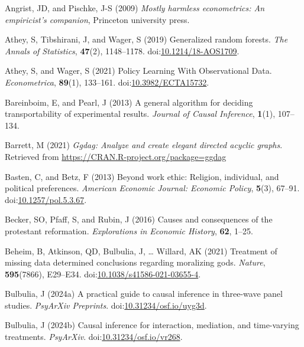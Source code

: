\documentclass[
  single column]{article}
\newlength{\cslhangindent}
\newenvironment{CSLReferences}[2] %
 {\begin{list}{}{%
  \setlength{\itemindent}{0pt}
  \setlength{\leftmargin}{0pt}
  \setlength{\parsep}{0pt}
  \ifodd #1
   \setlength{\leftmargin}{\cslhangindent}
   \setlength{\itemindent}{-1\cslhangindent}
  \fi
  \setlength{\itemsep}{#2\baselineskip}}}
 {\end{list}}
\begin{document}
\begin{CSLReferences}{1}{0}
Angrist, JD, and Pischke, J-S (2009) \emph{Mostly harmless econometrics:
An empiricist's companion}, Princeton university press.

Athey, S, Tibshirani, J, and Wager, S (2019) Generalized random forests.
\emph{The Annals of Statistics}, \textbf{47}(2), 1148--1178.
doi:\href{https://doi.org/10.1214/18-AOS1709}{10.1214/18-AOS1709}.

Athey, S, and Wager, S (2021) Policy Learning With Observational Data.
\emph{Econometrica}, \textbf{89}(1), 133--161.
doi:\href{https://doi.org/10.3982/ECTA15732}{10.3982/ECTA15732}.

Bareinboim, E, and Pearl, J (2013) A general algorithm for deciding
transportability of experimental results. \emph{Journal of Causal
Inference}, \textbf{1}(1), 107--134.

Barrett, M (2021) \emph{Ggdag: Analyze and create elegant directed
acyclic graphs}. Retrieved from
\url{https://CRAN.R-project.org/package=ggdag}

Basten, C, and Betz, F (2013) Beyond work ethic: Religion, individual,
and political preferences. \emph{American Economic Journal: Economic
Policy}, \textbf{5}(3), 67--91.
doi:\href{https://doi.org/10.1257/pol.5.3.67}{10.1257/pol.5.3.67}.

Becker, SO, Pfaff, S, and Rubin, J (2016) Causes and consequences of the
protestant reformation. \emph{Explorations in Economic History},
\textbf{62}, 1--25.

Beheim, B, Atkinson, QD, Bulbulia, J, \ldots{} Willard, AK (2021)
Treatment of missing data determined conclusions regarding moralizing
gods. \emph{Nature}, \textbf{595}(7866), E29--E34.
doi:\href{https://doi.org/10.1038/s41586-021-03655-4}{10.1038/s41586-021-03655-4}.

Bulbulia, J (2024a) A practical guide to causal inference in three-wave
panel studies. \emph{PsyArXiv Preprints}.
doi:\href{https://doi.org/10.31234/osf.io/uyg3d}{10.31234/osf.io/uyg3d}.

Bulbulia, J (2024b) Causal inference for interaction, mediation, and
time-varying treatments. \emph{PsyArXiv}.
doi:\href{https://doi.org/10.31234/osf.io/vr268}{10.31234/osf.io/vr268}.


\end{CSLReferences}
\end{document}
